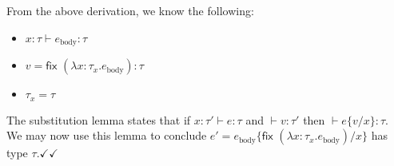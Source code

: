\documentclass[10pt, oneside]{article}
\begin{document}
\begin{enumerate}
\begin{enumerate}
\begin{prooftree}
			
		\end{prooftree}
		
		From the above derivation, we know the following:
		\begin{itemize}
			\item $x: \tau \vdash e_\text{body} :  \tau$
			\item $v = \textsf{fix } (\lambda x: \tau_x.e_\text{body}): \tau$
			\item $\tau_x = \tau$\\
		\end{itemize}
		
		The substitution lemma states that if $x:\tau' \vdash e:\tau$ and 
		$\vdash v:\tau'$ then $\vdash e\{v/x\}: \tau$.\\ We may now use this lemma to conclude $e' = e_\text{body} 
		\{\textsf{fix } (\lambda x: \tau_x.e_\text{body})/x \}$ has type $\tau. 
		\checkmark \checkmark$
		
	\end{enumerate}
\end{enumerate}
\end{document}
